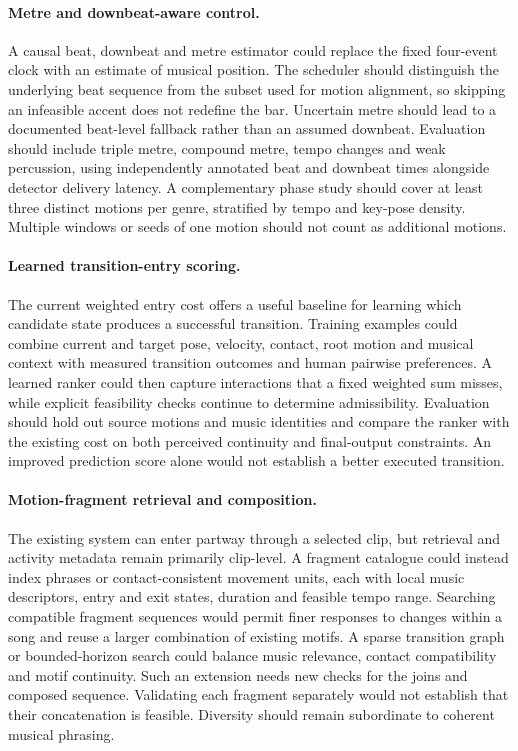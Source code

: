 \paragraph{Metre and downbeat-aware control.}
A causal beat, downbeat and metre estimator could replace the fixed four-event
clock with an estimate of musical position. The scheduler should distinguish
the underlying beat sequence from the subset used for motion alignment, so
skipping an infeasible accent does not redefine the bar. Uncertain metre should
lead to a documented beat-level fallback rather than an assumed downbeat.
Evaluation should include triple metre, compound metre, tempo changes and weak
percussion, using independently annotated beat and downbeat times alongside
detector delivery latency. A complementary phase study should cover at least
three distinct motions per genre, stratified by tempo and key-pose density.
Multiple windows or seeds of one motion should not count as additional motions.

\paragraph{Learned transition-entry scoring.}
The current weighted entry cost offers a useful baseline for learning which
candidate state produces a successful transition. Training examples could
combine current and target pose, velocity, contact, root motion and musical
context with measured transition outcomes and human pairwise preferences.
A learned ranker could then capture interactions that a fixed weighted sum
misses, while explicit feasibility checks continue to determine admissibility.
Evaluation should hold out source motions and music identities and compare the
ranker with the existing cost on both perceived continuity and final-output
constraints. An improved prediction score alone would not establish a better
executed transition.

\paragraph{Motion-fragment retrieval and composition.}
The existing system can enter partway through a selected clip, but retrieval
and activity metadata remain primarily clip-level. A fragment catalogue could
instead index phrases or contact-consistent movement units, each with local
music descriptors, entry and exit states, duration and feasible tempo range.
Searching compatible fragment sequences would permit finer responses to changes
within a song and reuse a larger combination of existing motifs. A sparse
transition graph or bounded-horizon search could balance music relevance,
contact compatibility and motif continuity. Such an extension needs new checks
for the joins and composed sequence. Validating each fragment separately would
not establish that their concatenation is feasible. Diversity should remain
subordinate to coherent musical phrasing.

